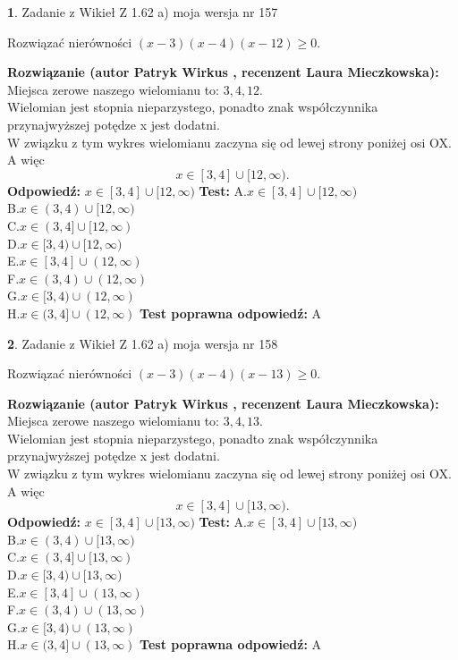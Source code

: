 \documentclass[12pt, a4paper]{article}
\theoremstyle{definition} %
\newtheorem{zad}{}
\newcommand{\zadStart}[1]{\begin{zad}#1\newline}
\newcommand{\zadStop}{\end{zad}}
\newcommand{\rozwStart}[2]{\noindent \textbf{Rozwiązanie (autor #1 , recenzent #2): }\newline}
\newcommand{\rozwStop}{\newline}
\newcommand{\odpStart}{\noindent \textbf{Odpowiedź:}\newline}
\newcommand{\odpStop}{\newline}
\newcommand{\testStart}{\noindent \textbf{Test:}\newline}
\newcommand{\testStop}{\newline}
\newcommand{\kluczStart}{\noindent \textbf{Test poprawna odpowiedź:}\newline}
\newcommand{\kluczStop}{\newline}
\begin{document}
\zadStart{Zadanie z Wikieł Z 1.62 a) moja wersja nr 157}

Rozwiązać nierówności $(x-3)(x-4)(x-12)\ge0$.
\zadStop
\rozwStart{Patryk Wirkus}{Laura Mieczkowska}
Miejsca zerowe naszego wielomianu to: $3, 4, 12$.\\
Wielomian jest stopnia nieparzystego, ponadto znak współczynnika przy\linebreak najwyższej potędze x jest dodatni.\\ W związku z tym wykres wielomianu zaczyna się od lewej strony poniżej osi OX. A więc $$x \in [3,4] \cup [12,\infty).$$
\rozwStop
\odpStart
$x \in [3,4] \cup [12,\infty)$
\odpStop
\testStart
A.$x \in [3,4] \cup [12,\infty)$\\
B.$x \in (3,4) \cup [12,\infty)$\\
C.$x \in (3,4] \cup [12,\infty)$\\
D.$x \in [3,4) \cup [12,\infty)$\\
E.$x \in [3,4] \cup (12,\infty)$\\
F.$x \in (3,4) \cup (12,\infty)$\\
G.$x \in [3,4) \cup (12,\infty)$\\
H.$x \in (3,4] \cup (12,\infty)$
\testStop
\kluczStart
A
\kluczStop



\zadStart{Zadanie z Wikieł Z 1.62 a) moja wersja nr 158}

Rozwiązać nierówności $(x-3)(x-4)(x-13)\ge0$.
\zadStop
\rozwStart{Patryk Wirkus}{Laura Mieczkowska}
Miejsca zerowe naszego wielomianu to: $3, 4, 13$.\\
Wielomian jest stopnia nieparzystego, ponadto znak współczynnika przy\linebreak najwyższej potędze x jest dodatni.\\ W związku z tym wykres wielomianu zaczyna się od lewej strony poniżej osi OX. A więc $$x \in [3,4] \cup [13,\infty).$$
\rozwStop
\odpStart
$x \in [3,4] \cup [13,\infty)$
\odpStop
\testStart
A.$x \in [3,4] \cup [13,\infty)$\\
B.$x \in (3,4) \cup [13,\infty)$\\
C.$x \in (3,4] \cup [13,\infty)$\\
D.$x \in [3,4) \cup [13,\infty)$\\
E.$x \in [3,4] \cup (13,\infty)$\\
F.$x \in (3,4) \cup (13,\infty)$\\
G.$x \in [3,4) \cup (13,\infty)$\\
H.$x \in (3,4] \cup (13,\infty)$
\testStop
\kluczStart
A
\kluczStop
\end{document}
